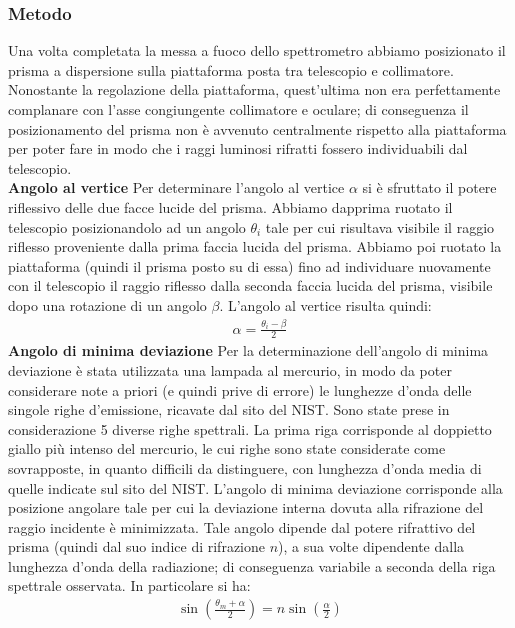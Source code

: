 \documentclass[a4paper]{article}
\begin{document}
\subsubsection{Metodo}
Una volta completata la messa a fuoco dello spettrometro abbiamo posizionato il prisma a dispersione sulla piattaforma posta tra telescopio e collimatore. Nonostante la regolazione della piattaforma, quest'ultima non era perfettamente complanare con l'asse congiungente collimatore e oculare; di conseguenza il posizionamento del prisma non è avvenuto centralmente rispetto alla piattaforma per poter fare in modo che i raggi luminosi rifratti fossero individuabili dal telescopio.
\newline\\
\textbf{Angolo al vertice} \newline
Per determinare l'angolo al vertice $\alpha$ si è sfruttato il potere riflessivo delle due facce lucide del prisma. Abbiamo dapprima ruotato il telescopio posizionandolo ad un angolo $\theta_i$ tale per cui risultava visibile il raggio riflesso proveniente dalla prima faccia lucida del prisma. Abbiamo poi ruotato la piattaforma (quindi il prisma posto su di essa) fino ad individuare nuovamente con il telescopio il raggio riflesso dalla seconda faccia lucida del prisma, visibile dopo una rotazione di un angolo $\beta$. L'angolo al vertice risulta quindi:
\begin{align}
    \alpha = \frac{\theta_i -\beta}{2}
\label{eq:angolo al vertice}
\end{align}
\textbf{Angolo di minima deviazione}\newline
Per la determinazione dell'angolo di minima deviazione è stata utilizzata una lampada al mercurio, in modo da poter considerare note a priori (e quindi prive di errore) le lunghezze d'onda delle singole righe d'emissione, ricavate dal sito del NIST.
Sono state prese in considerazione 5 diverse righe spettrali. La prima riga corrisponde al doppietto giallo più intenso del mercurio, le cui righe sono state considerate come sovrapposte, in quanto difficili da distinguere, con lunghezza d'onda media di quelle indicate sul sito del NIST.
L'angolo di minima deviazione corrisponde alla posizione angolare tale per cui la deviazione interna dovuta alla rifrazione del raggio incidente è minimizzata. Tale angolo dipende dal potere rifrattivo del prisma (quindi dal suo indice di rifrazione $n$), a sua volte dipendente dalla lunghezza d'onda della radiazione; di conseguenza variabile a seconda della riga spettrale osservata. In particolare si ha:
\begin{align}
    \sin(\frac{\theta_m + \alpha}{2}) = n\sin(\frac{\alpha}{2})
\label{eq:angolo min deviazione}
\end{align}
\end{document}
